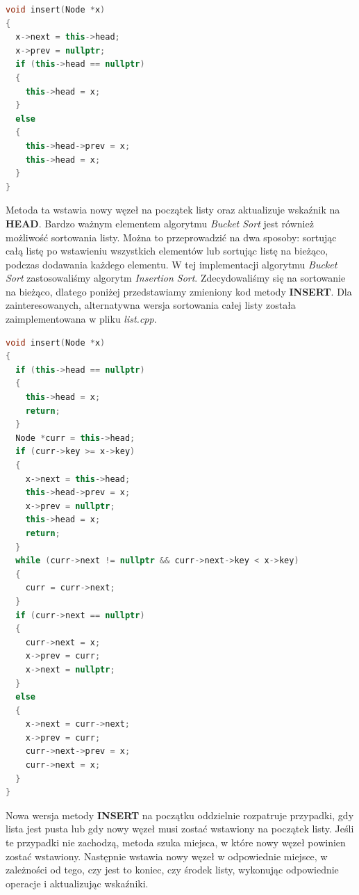 \documentclass{article}
\begin{document}
\begin{lstlisting}[style=mystyle, language=C++, caption={Implementacja \texttt{Insert}}, label={lst:list_insert}]
void insert(Node *x)
{
  x->next = this->head;
  x->prev = nullptr;
  if (this->head == nullptr)
  {
    this->head = x;
  }
  else
  {
    this->head->prev = x;
    this->head = x;
  }
}
\end{lstlisting}
Metoda ta wstawia nowy węzeł na początek listy oraz aktualizuje wskaźnik na \textbf{HEAD}. Bardzo ważnym elementem algorytmu \textit{Bucket Sort} jest również możliwość sortowania listy. Można to przeprowadzić na dwa sposoby: sortując całą listę po wstawieniu wszystkich elementów lub sortując listę na bieżąco, podczas dodawania każdego elementu. W tej implementacji algorytmu \textit{Bucket Sort} zastosowaliśmy algorytm \textit{Insertion Sort}. Zdecydowaliśmy się na sortowanie na bieżąco, dlatego poniżej przedstawiamy zmieniony kod metody \textbf{INSERT}. Dla zainteresowanych, alternatywna wersja sortowania całej listy została zaimplementowana w pliku \textit{list.cpp}.
\newpage
\begin{lstlisting}[style=mystyle, language=C++, caption={Implementacja \texttt{Insert} z sortowaniem}, label={lst:insert2}]
void insert(Node *x)
{
  if (this->head == nullptr)
  {
    this->head = x;
    return;
  }
  Node *curr = this->head;
  if (curr->key >= x->key)
  {
    x->next = this->head;
    this->head->prev = x;
    x->prev = nullptr;
    this->head = x;
    return;
  }
  while (curr->next != nullptr && curr->next->key < x->key)
  {
    curr = curr->next;
  }
  if (curr->next == nullptr)
  {
    curr->next = x;
    x->prev = curr;
    x->next = nullptr;
  }
  else
  {
    x->next = curr->next;
    x->prev = curr;
    curr->next->prev = x;
    curr->next = x;
  }
}
\end{lstlisting}
Nowa wersja metody \textbf{INSERT} na początku oddzielnie rozpatruje przypadki, gdy lista jest pusta lub gdy nowy węzeł musi zostać wstawiony na początek listy. Jeśli te przypadki nie zachodzą, metoda szuka miejsca, w które nowy węzeł powinien zostać wstawiony. Następnie wstawia nowy węzeł w odpowiednie miejsce, w zależności od tego, czy jest to koniec, czy środek listy, wykonując odpowiednie operacje i aktualizując wskaźniki.
\end{document}
